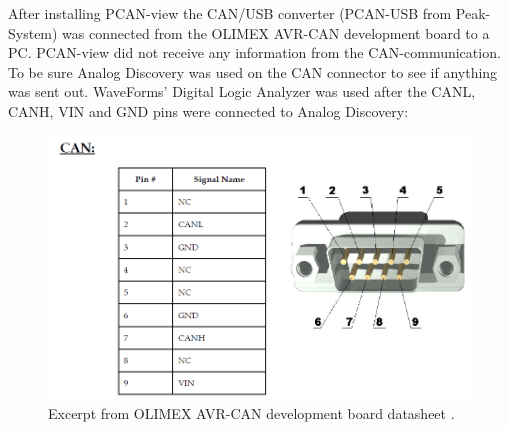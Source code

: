 After installing PCAN-view the CAN/USB converter (PCAN-USB from Peak-System) was connected from the OLIMEX AVR-CAN development board to a PC. PCAN-view did not receive any information from the CAN-communication. To be sure Analog Discovery was used on the CAN connector to see if anything was sent out. WaveForms' Digital Logic Analyzer was used after the CANL, CANH, VIN and GND pins were connected to Analog Discovery:\\
\begin{figure}[H]
	\centering
	\includegraphics[width=0.5\linewidth]{Software/SnipFromOlimexDatasheet.PNG}
	\caption{Excerpt from OLIMEX AVR-CAN development board datasheet \cite{BMSAVRCAN}.}
	\label{fig:OLIMEX_AVR-CAN_BMS}
\end{figure}

